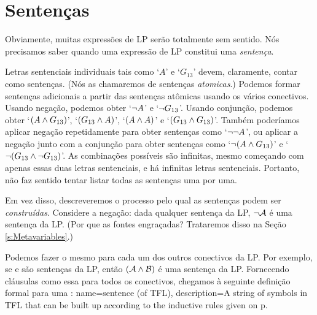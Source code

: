 \section{Sentenças}\label{s:Sentences}
Obviamente, muitas expressões de LP serão totalmente sem sentido.
Nós precisamos saber quando uma expressão de LP constitui uma \emph{sentença}.

Letras sentenciais individuais tais como `$A$' e `$G_{13}$' devem, claramente, contar como sentenças.
(Nós as chamaremos de sentenças \emph{atomicas}.)
Podemos formar sentenças adicionais a partir das sentenças atômicas usando os vários conectivos.
Usando negação, podemos obter `$\neg A$' e `$\neg G_{13} $'.
Usando conjunção, podemos obter `$(A \wedge G_{13})$', `$(G_{13} \wedge A)$', `$(A \wedge A)$' e `$(G_{13} \wedge G_{13})$'.
Também poderíamos aplicar negação repetidamente para obter sentenças como `$\neg\neg A$', ou aplicar a negação junto com a conjunção para obter sentenças como `$\neg(A \wedge G_{13})$' e `$\neg(G_{13} \wedge \neg G_{13})$'.
As combinações possíveis são infinitas, mesmo começando com apenas essas duas letras sentenciais, e há infinitas letras sentenciais.
Portanto, não faz sentido tentar listar todas as sentenças uma por uma.

Em vez disso, descreveremos o processo pelo qual as sentenças podem ser \emph{construídas}.
Considere a negação: dada qualquer sentença  da LP, $\neg\mathcal{A}$ é uma sentença da LP.
(Por que as fontes engraçadas? Trataremos disso na Seção \ref{s:Metavariables}.)

Podemos fazer o mesmo para cada um dos outros conectivos da LP.
Por exemplo, se  e  são sentenças da LP, então $(\mathcal{A}\wedge\mathcal{B})$ é uma sentença da LP.
Fornecendo cláusulas como essa para todos os conectivos, chegamos à seguinte definição formal para uma :
{\small 
	}
{
name=sentence (of TFL),
description={A string of symbols in TFL that can be built up according to the inductive rules given on p.~\pageref{TFLsentences}}
}

